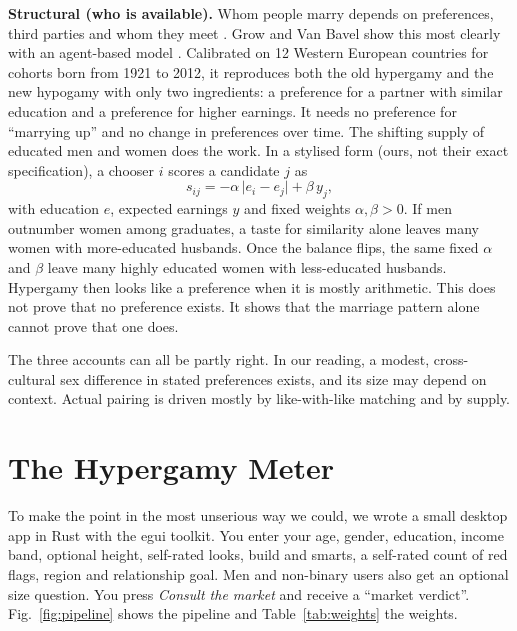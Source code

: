 \documentclass[conference,a4paper]{IEEEtran}
\begin{document}
\textbf{Structural (who is available).} Whom people marry depends on preferences, third parties and whom they meet \cite{kalmijn1998}. Grow and Van Bavel show this most clearly with an agent-based model \cite{grow2015}. Calibrated on 12 Western European countries for cohorts born from 1921 to 2012, it reproduces both the old hypergamy and the new hypogamy with only two ingredients: a preference for a partner with similar education and a preference for higher earnings. It needs no preference for ``marrying up'' and no change in preferences over time. The shifting supply of educated men and women does the work. In a stylised form (ours, not their exact specification), a chooser $i$ scores a candidate $j$ as
\begin{equation}
s_{ij} = -\alpha\,\lvert e_i - e_j\rvert + \beta\, y_j ,
\end{equation}
with education $e$, expected earnings $y$ and fixed weights $\alpha,\beta>0$. If men outnumber women among graduates, a taste for similarity alone leaves many women with more-educated husbands. Once the balance flips, the same fixed $\alpha$ and $\beta$ leave many highly educated women with less-educated husbands. Hypergamy then looks like a preference when it is mostly arithmetic. This does not prove that no preference exists. It shows that the marriage pattern alone cannot prove that one does.

The three accounts can all be partly right. In our reading, a modest, cross-cultural sex difference in stated preferences exists, and its size may depend on context. Actual pairing is driven mostly by like-with-like matching and by supply.

\section{The Hypergamy Meter}
\label{sec:app}
To make the point in the most unserious way we could, we wrote a small desktop app in Rust with the egui toolkit. You enter your age, gender, education, income band, optional height, self-rated looks, build and smarts, a self-rated count of red flags, region and relationship goal. Men and non-binary users also get an optional size question. You press \emph{Consult the market} and receive a ``market verdict''. Fig.~\ref{fig:pipeline} shows the pipeline and Table~\ref{tab:weights} the weights.
\end{document}
